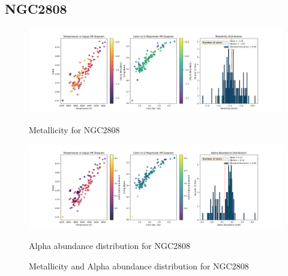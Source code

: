 \documentclass[a4paper,12pt]{article}
\begin{document}
\subsection{NGC2808}
\begin{figure}[H]
    \centering
    \begin{minipage}[b]{0.8\textwidth}
        \centering
        \includegraphics[width=\textwidth]{NGC2808_metalicity.png}
        \caption{Metallicity for NGC2808}
        \label{fig:NGC2808_metalicity}
    \end{minipage}
    \hfill
    \begin{minipage}[b]{0.8\textwidth}
        \centering
        \includegraphics[width=\textwidth]{NGC2808_alpha.png}
        \caption{Alpha abundance distribution for NGC2808}
        \label{fig:NGC2808_alpha}
    \end{minipage}
    \caption{Metallicity and Alpha abundance distribution for NGC2808}
    \label{fig:NGC2808_combined}
\end{figure}
\clearpage
\end{document}
